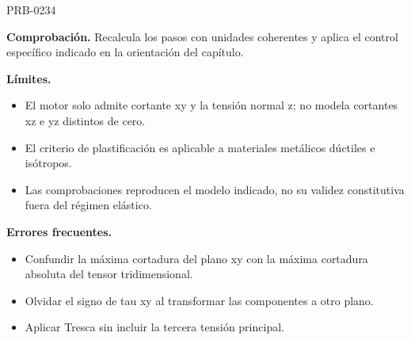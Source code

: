 \begin{studiumworked}{PRB-0234}
\par\textbf{Comprobación.} Recalcula los pasos con unidades coherentes y aplica el control específico indicado en la orientación del capítulo.

\textbf{Límites.}\begin{itemize}\item El motor solo admite cortante xy y la tensión normal z; no modela cortantes xz e yz distintos de cero.
\item El criterio de plastificación es aplicable a materiales metálicos dúctiles e isótropos.
\item Las comprobaciones reproducen el modelo indicado, no su validez constitutiva fuera del régimen elástico.\end{itemize}

\textbf{Errores frecuentes.}\begin{itemize}\item Confundir la máxima cortadura del plano xy con la máxima cortadura absoluta del tensor tridimensional.
\item Olvidar el signo de tau xy al transformar las componentes a otro plano.
\item Aplicar Tresca sin incluir la tercera tensión principal.\end{itemize}

\end{studiumworked}

\Needspace{.3\textheight}

